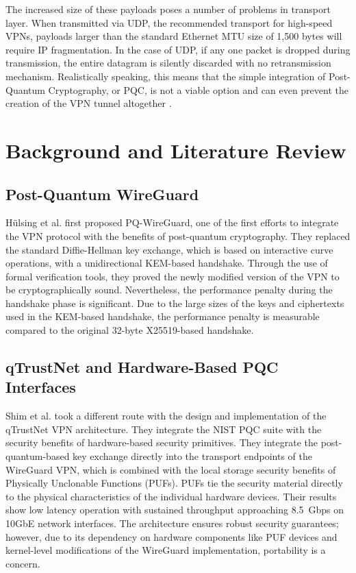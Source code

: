 \documentclass[10pt, conference, letterpaper]{IEEEtran}
\begin{document}
The increased size of these payloads poses a number of problems in transport layer. When transmitted via UDP, the recommended transport for high-speed VPNs, payloads larger than the standard Ethernet MTU size of 1,500 bytes will require IP fragmentation. In the case of UDP, if any one packet is dropped during transmission, the entire datagram is silently discarded with no retransmission mechanism. Realistically speaking, this means that the simple integration of Post-Quantum Cryptography, or PQC, is not a viable option and can even prevent the creation of the VPN tunnel altogether \cite{shim2025qtrustnet}.

\section{Background and Literature Review}

\subsection{Post-Quantum WireGuard}
H\"ulsing et al. \cite{hulsing2017pqwireguard} first proposed PQ-WireGuard, one of the first efforts to integrate the VPN protocol with the benefits of post-quantum cryptography. They replaced the standard Diffie-Hellman key exchange, which is based on interactive curve operations, with a unidirectional KEM-based handshake. Through the use of formal verification tools, they proved the newly modified version of the VPN to be cryptographically sound. Nevertheless, the performance penalty during the handshake phase is significant. Due to the large sizes of the keys and ciphertexts used in the KEM-based handshake, the performance penalty is measurable compared to the original 32-byte X25519-based handshake.

\subsection{qTrustNet and Hardware-Based PQC Interfaces}
Shim et al. \cite{shim2025qtrustnet} took a different route with the design and implementation of the qTrustNet VPN architecture. They integrate the NIST PQC suite with the security benefits of hardware-based security primitives. They integrate the post-quantum-based key exchange directly into the transport endpoints of the WireGuard VPN, which is combined with the local storage security benefits of Physically Unclonable Functions (PUFs). PUFs tie the security material directly to the physical characteristics of the individual hardware devices. Their results show low latency operation with sustained throughput approaching 8.5~Gbps on 10GbE network interfaces. The architecture ensures robust security guarantees; however, due to its dependency on hardware components like PUF devices and kernel-level modifications of the WireGuard implementation, portability is a concern.
\end{document}
